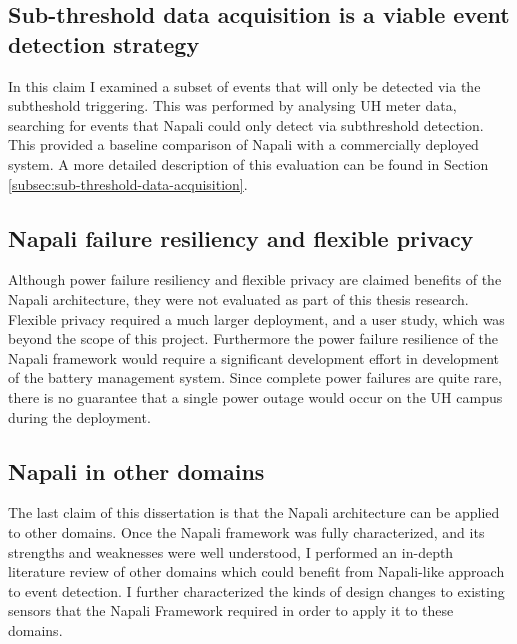 \subsection{Sub-threshold data acquisition is a viable event detection strategy}\label{subsec:sub-threshold-data-acquisition:}
In this claim I examined a subset of events that will only be detected via the subtheshold triggering.
This was performed by analysing UH meter data, searching for events that Napali could only detect via subthreshold detection.
This provided a baseline comparison of Napali with a commercially deployed system.
A more detailed description of this evaluation can be found in Section \ref{subsec:sub-threshold-data-acquisition}.

\subsection{Napali failure resiliency and flexible privacy}\label{subsec:napali-failure-resiliency-and-flexible-privacy}
Although power failure resiliency and flexible privacy are claimed benefits of the Napali architecture, they were not evaluated as part of this thesis research.
Flexible privacy required a much larger deployment, and a user study, which was beyond the scope of this project.
Furthermore the power failure resilience of the Napali framework would require a significant development effort in development of the battery management system.
Since complete power failures are quite rare, there is no guarantee that a single power outage would occur on the UH campus during the deployment.

\subsection{Napali in other domains}\label{subsec:napali-in-other-domains}
The last claim of this dissertation is that the Napali architecture can be applied to other domains.
Once the Napali framework was fully characterized, and its strengths and weaknesses were well understood, I performed an in-depth literature review of other domains which could benefit from Napali-like approach to event detection.
I further characterized the kinds of design changes to existing sensors that the Napali Framework required in order to apply it to these domains.

